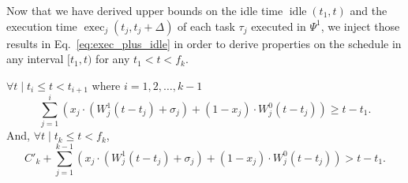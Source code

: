 
Now that we have derived upper bounds on the idle time $\operatorname{idle}(t_1, t)$ and the execution time $\operatorname{exec}_j(t_j, t_j+\Delta)$ of each task $\tau_j$ executed in $\Psi^1$, we inject those results in Eq.~\eqref{eq:exec_plus_idle} in order to derive properties on the schedule in any interval $[t_1, t)$ for any $t_1 < t < f_k$.
\begin{Lemma}
  \label{lemma:conclusion-step2}
$\forall t \mid t_{i} \leq t < t_{i+1}$ where $i=1,2,\ldots,k-1$
{\footnotesize \begin{equation}
\label{eq:exec_plus_idle-2}
\sum_{j=1}^{i} \left( x_j\cdot (W_j^1(t-t_j) +\sigma_j) + (1-x_j)\cdot W_j^0(t-t_j) \right) \geq t-t_1.
\end{equation}}
 And, $\forall t \mid t_k \leq t < f_k$,
{\footnotesize \begin{equation}
\label{eq:exec_plus_idle-3}
C'_k +\sum_{j=1}^{k-1} \left( x_j \cdot (W_j^1(t-t_j) +\sigma_j) + (1-x_j)\cdot W_j^0(t-t_j) \right) > t-t_1.
\end{equation}}
\end{Lemma}
